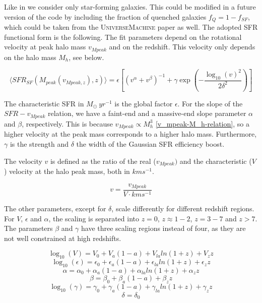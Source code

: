 Like in \cite{dallarmi_dipole_2022} we consider only star-forming galaxies. This could be modified in a future version of the code by including the fraction of quenched galaxies $f_Q = 1 -f_{SF}$, which could be taken from the \textsc{UniverseMachine} paper as well. The adopted SFR functional form is the following. The fit parameters depend on the rotational velocity at peak halo mass $v_{Mpeak}$ and on the redshift. This velocity only depends on the halo mass $M_h$, see below.

\begin{equation}
    \langle SFR_{SF}(M_{peak}(v_{Mpeak, z}), z)\rangle = \epsilon \left[ \left( v^\alpha + v^\beta \right)^{-1} + \gamma \exp \left(-\frac{\log_{10}(v)^2}{2\delta^2}\right) \right]
\end{equation}

The characteristic SFR  in $M_\odot\ yr^{-1}$ is the global factor $\epsilon$. For the slope of the $SFR-v_{Mpeak}$ relation, we have a faint-end and a massive-end slope parameter $\alpha$ and $\beta$, respectively. This is because $v_{Mpeak} \propto M_h^3$ \ref{v_mpeak-M_h-relation}, so a higher velocity at the peak mass corresponds to a higher halo mass.
Furthermore, $\gamma$ is the strength and $\delta$ the width of the Gaussian SFR efficiency boost. 

The velocity $v$ is defined as the ratio of the real ($v_{Mpeak})$ and the characteristic ($V$) velocity at the halo peak mass, both in $km s^{-1}$.

\begin{equation}
    v = \frac{v_{Mpeak}}{V \cdot km s^{-1}}
\end{equation}

The other parameters, except for $\delta$, scale differently for different redshift regions. For $V$, $\epsilon$ and $\alpha$, the scaling is separated into $z=0$, $z\approx 1-2$, $z=3-7$ and $z>7$. The parameters $\beta$ and $\gamma$ have three scaling regions instead of four, as they are not well constrained at high redshifts. 

\begin{equation}
    \log_{10}(V) = V_0 + V_a(1-a)+V_{la}ln(1+z)+V_z z
\end{equation}
\begin{equation}
    \log_{10}(\epsilon) = \epsilon_0 + \epsilon_a(1-a)+\epsilon_{la}ln(1+z)+\epsilon_z z
\end{equation}
\begin{equation}
    \alpha = \alpha_0 + \alpha_a(1-a)+\alpha_{la}ln(1+z)+\alpha_z z
\end{equation}
\begin{equation}
    \beta = \beta_0 + \beta_a(1-a)+\beta_z z
\end{equation}
\begin{equation}
    \log_{10}(\gamma) = \gamma_0 + \gamma_a(1-a)+\gamma_{la}ln(1+z)+\gamma_z z
\end{equation}
\begin{equation}
    \delta = \delta_0
\end{equation}



